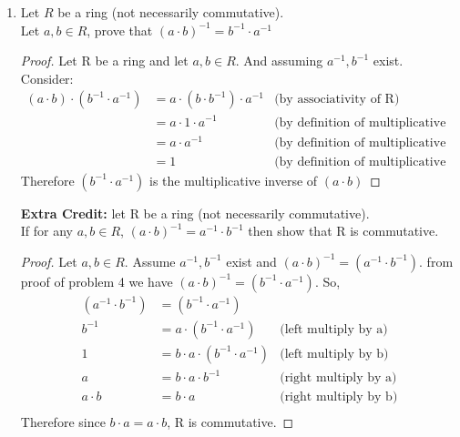 \documentclass{article}
\begin{document}
\begin{enumerate}
\begin{proof}
				Therefore M is a Subring of R
		\end{proof}
		
		\item Let $R$ be a ring (not necessarily commutative). \\
		Let $a,b \in R$, prove that $(a \cdot b)^{-1} = b^{-1} \cdot a^{-1}$
		\begin{proof}
			Let R be a ring and let $a,b \in R$. And assuming $a^{-1}, b^{-1}$ exist.   
			Consider:
			\begin{align*}
				 (a \cdot b) \cdot (b^{-1} \cdot a^{-1}) &= a \cdot (b \cdot b^{-1}) \cdot a^{-1} & \text{(by associativity of R)}\\
						 						&= a \cdot 1 \cdot a^{-1} & \text{(by definition of multiplicative inverse)}\\
						 						&= a \cdot  a^{-1} & \text{(by definition of multiplicative identity)}\\
						 						&= 1 &\text{(by definition of multiplicative inverse)}
			\end{align*}
			Therefore  $(b^{-1} \cdot a^{-1})$ is the multiplicative inverse of $(a\cdot b)$
		\end{proof}
		
		\textbf{Extra Credit:}
		let R be a ring (not necessarily commutative).\\
		If for any $a,b \in R$, $(a\cdot b)^{-1} = a^{-1} \cdot b^{-1}$ then show that R is commutative.
		\begin{proof}
		Let $a,b \in R$.
		Assume $a^{-1}, b^{-1}$ exist and $(a \cdot b)^{-1} =(a^{-1} \cdot b^{-1})$. from proof of problem 4 we have $(a \cdot b)^{-1} = (b^{-1} \cdot a^{-1})$. 
		So,
		\begin{align*}
			(a^{-1} \cdot b^{-1}) &= (b^{-1} \cdot a^{-1})\\
			 b^{-1} &= a \cdot (b^{-1} \cdot a^{-1})		 &\text{(left multiply by a)}\\
			 	  1 &= b\cdot a \cdot (b^{-1} \cdot a^{-1})  &\text{(left multiply by b)}\\
			 	  a &= b \cdot a \cdot b^{-1} 				 &\text{(right multiply by a)}\\
			 a \cdot b &= b \cdot a                          &\text{(right multiply by b)}\\
		\end{align*}
		Therefore since $b \cdot a = a \cdot b$, R is commutative. 
		\end{proof}
	\end{enumerate}
\end{document}
